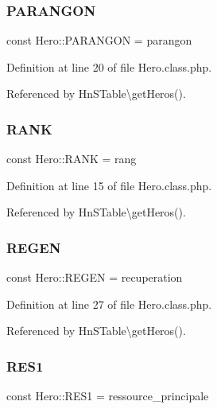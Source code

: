 \subsubsection{\texorpdfstring{P\+A\+R\+A\+N\+G\+ON}{PARANGON}}
{\footnotesize\ttfamily const Hero\+::\+P\+A\+R\+A\+N\+G\+ON = \textquotesingle{}parangon\textquotesingle{}}



Definition at line 20 of file Hero.\+class.\+php.



Referenced by Hn\+S\+Table\textbackslash{}get\+Heros().

\mbox{\label{class_hero_a8bdfca716a1fc6780b5989b950866b4a}} 
\subsubsection{\texorpdfstring{R\+A\+NK}{RANK}}
{\footnotesize\ttfamily const Hero\+::\+R\+A\+NK = \textquotesingle{}rang\textquotesingle{}}



Definition at line 15 of file Hero.\+class.\+php.



Referenced by Hn\+S\+Table\textbackslash{}get\+Heros().

\mbox{\label{class_hero_a1c41f749aaa77bbe9b0cab282234426a}} 
\subsubsection{\texorpdfstring{R\+E\+G\+EN}{REGEN}}
{\footnotesize\ttfamily const Hero\+::\+R\+E\+G\+EN = \textquotesingle{}recuperation\textquotesingle{}}



Definition at line 27 of file Hero.\+class.\+php.



Referenced by Hn\+S\+Table\textbackslash{}get\+Heros().

\mbox{\label{class_hero_a0ce73cd2a000323e72b2aaff1d14b638}} 
\subsubsection{\texorpdfstring{R\+E\+S1}{RES1}}
{\footnotesize\ttfamily const Hero\+::\+R\+E\+S1 = \textquotesingle{}ressource\+\_\+principale\textquotesingle{}}



